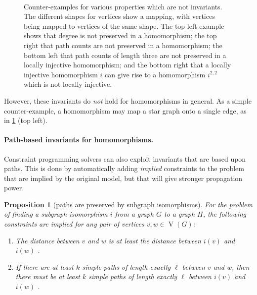 \documentclass{article}
\newtheorem{proposition}{Proposition}
\newcommand{\vertexset}{\operatorname{V}}
\begin{document}
\begin{figure}
\begin{minipage}{3cm}
\end{minipage}\hfill\,

    \caption{Counter-examples for various properties which are not invariants. The different shapes
        for vertices show a mapping, with vertices being mapped to vertices of the same shape. The
        top left example shows that degree is not preserved in a homomorphism; the top right that path
        counts are not preserved in a homomorphism; the bottom left that path counts of length three
        are not preserved in a locally injective homomorphism; and the bottom right that a locally
        injective homomorphism $i$ can give rise to a homomorphism $i^{2,2}$ which is not locally
        injective.} \label{figure:counterexamples}
\end{figure}

However, these invariants do \emph{not} hold for homomorphisms in general. As a simple
counter-example, a homomorphism may map a star graph onto a single edge, as in
\cref{figure:counterexamples} (top left).

\paragraph{Path-based invariants for homomorphisms.} Constraint programming solvers can also exploit
invariants that are based upon paths. This is done by automatically adding \emph{implied}
constraints to the problem that are implied by the original model, but that will give stronger
propagation power.

\begin{proposition}[paths are preserved by subgraph isomorphisms]\label{proposition:distances}For
    the problem of finding a subgraph isomorphism $i$ from a graph $G$ to a graph $H$, the following
    constraints are implied for any pair of vertices $v, w \in \vertexset(G)$:
    \begin{enumerate}
        \item The distance between $v$ and $w$ is at least the distance between $i(v)$ and $i(w)$
            \cite{DBLP:conf/cp/AudemardLMGP14}.
        \item If there are at least $k$ simple
            paths of length exactly $\ell$ between $v$ and $w$, then there must be at least $k$
            simple paths of length exactly $\ell$ between $i(v)$ and $i(w)$
            \cite{DBLP:conf/cp/McCreeshP15}.
    \end{enumerate}
\end{proposition}
\end{document}
